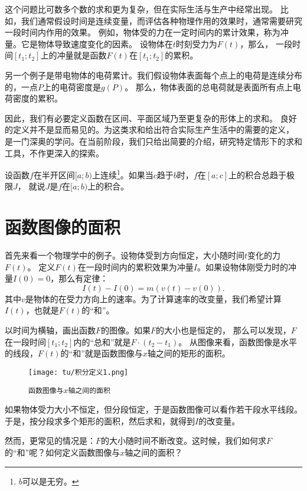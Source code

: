 \documentclass[12pt,UTF8]{ctexbook}
\begin{document}
这个问题比可数多个数的求和更为复杂，但在实际生活与生产中经常出现。
比如，我们通常假设时间是连续变量，而评估各种物理作用的效果时，通常需要研究一段时间内作用的效果。
例如，物体受的力在一定时间内的累计效果，称为冲量。它是物体导致速度变化的因素。
设物体在$t$时刻受力为$F(t)$，那么，
一段时间$[t_1; t_2]$上的冲量就是函数$F(t)$在$[t_1; t_2]$的累积。

另一个例子是带电物体的电荷累计。我们假设物体表面每个点上的电荷是连续分布的，一点$P$上的电荷密度是$g(P)$。
那么，物体表面的总电荷就是表面所有点上电荷密度的累积。

因此，我们有必要定义函数在区间、平面区域乃至更复杂的形体上的求和。
良好的定义并不是显而易见的。为这类求和给出符合实际生产生活中的需要的定义，
是一门深奥的学问。在当前阶段，我们只给出简要的介绍，研究特定情形下的求和工具，不作更深入的探索。

\begin{df}
    设函数$f$在半开区间$[a;b)$上连续\footnote{$b$可以是无穷。}。如果当$c$趋于$b$时，$f$在$[a;c]$上的积合总趋于极限$J$，
    就说$J$是$f$在$[a;b)$上的积合。
\end{df}\section{函数图像的面积}

首先来看一个物理学中的例子。设物体受到方向恒定，大小随时间$t$变化的力$F(t)$。
定义$F(t)$在一段时间内的累积效果为冲量$I$。如果设物体刚受力时的冲量$I(0) = 0$，那么有定律：
$$ I(t) - I(0) = m(v(t) - v(0)).$$
其中$v$是物体的在受力方向上的速率。为了计算速率的改变量，我们希望计算$I(t)$，也就是$F(t)$的“和”。

以时间为横轴，画出函数$F$的图像。如果$F$的大小也是恒定的，
那么可以发现，$F$在一段时间$[t_1; t_2]$内的“总和”就是$F \cdot (t_2 - t_1)$。
从图像来看，函数图像是水平的线段，$F(t)$的“和”就是函数图像与$x$轴之间的矩形的面积。

\begin{figure}[h] %
    \vspace{4pt}
    \centering
    \texttt{[image: tu/积分定义1.png]}
    \caption*{\texttt{函数图像与$x$轴之间的面积}}
\end{figure}

如果物体受力大小不恒定，但分段恒定，于是函数图像可以看作若干段水平线段。
于是，按分段求多个矩形的面积，然后求和，就得到$I$的改变量。

然而，更常见的情况是：$F$的大小随时间不断改变。这时候，我们如何求$F$的“和”呢？如何定义函数图像与$x$轴之间的面积？
\end{document}
